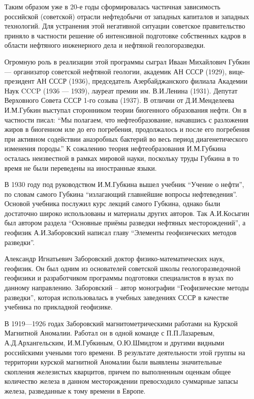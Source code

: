 Таким образом уже в 20-е годы сформировалась частичная зависимость российской (советской) отрасли нефтедобычи от западных капиталов и западных технологий.
Для устранения этой негативной ситуации советское правительство приняло в частности решение об интенсивной подготовке собственных кадров в области нефтяного инженерного дела и нефтяной геологоразведки.

Огромную роль в реализации этой программы сыграл Иваан Михайлович Губкин --- организатор советской нефтяной геологии, академик АН СССР (1929), вице-президент АН СССР (1936), председатель Азербайджанского филиала Академии Наук CCCP (1936 --- 1939), лауреат премии им.
В.И.Ленина (1931).
Депутат Верховного Совета СССР 1-го созыва (1937).
В отличии от Д.И.Менделеева И.М.Губкин выступал сторонником теории биогенного образования нефти.
Он в частности писал: ``Мы полагаем, что нефтеобразование, начавшись с разложения жиров в биогенном иле до его погребения, продолжалось и после его погребения при активном содействии анаэробных бактерий во весь период диагенетического изменения породы.''
К сожалению теория нефтеобразования И.М.Губкина осталась неизвестной в рамках мировой науки, поскольку труды Губкина в то время не были переведены на иностранные языки.

В 1930 году под руководством И.М.Губкина вышел учебник ``Учение о нефти'', по словам самого Губкина ``излагающий главнейшие вопросы нефтеведения''.
Основой учебника послужил курс лекций самого Губкина, однако были достаточно широко использованы и материалы других авторов.
Так А.И.Косыгин был автором раздела ``Основные приёмы разведки нефтяных месторождений'', а геофизик А.И.Заборовский написал главу ``Элементы геофизических методов разведки''.

Александр Игнатьевич Заборовский доктор физико-математических наук, геофизик.
Он был одним из основателей советской школы геологоразведочной геофизики и разработчиком программы подготовки специалистов в вузах по данному направлению.
Заборовский -- автор монографии ``Геофизические методы разведки'', которая использовалась в учебных заведениях СССР в качестве учебника по прикладной геофизике.

В 1919---1926 годах Заборовский магнитометрическими работами на Курской Магнитной Аномалии.
Работал он в одной команде с П.П.Лазаревым, А.Д.Архангельским, И.М.Губкиным, О.Ю.Шмидтом и другими видными российскими учеными того времени.
В результате деятельности этой группы на территории курской магнитной Аномалии были выявлены значительные скопления железистых кварцитов, причем по выполненным оценкам общее количество железа в данном месторождении превосходило суммарные запасы железа, разведанные к тому времени в Европе.

